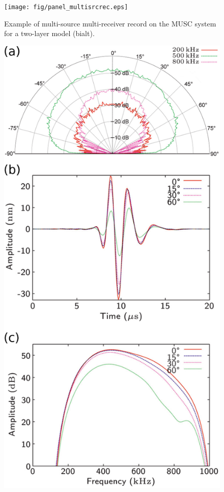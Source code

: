 \documentclass[manuscript,revised]{geophysics}
\begin{document}
\begin{figure}[!h]
	\centering
	\texttt{[image: fig/panel\_multisrcrec.eps]}
	\caption{Example of multi-source multi-receiver record on the MUSC system for a two-layer model (bialt).}
	\label{panel_multisrcrec}
\end{figure}

\begin{figure}[!ht]
	\centering
	\includegraphics[scale=0.4]{fig/piezo-source-validation.eps}

\end{figure}
\end{document}
